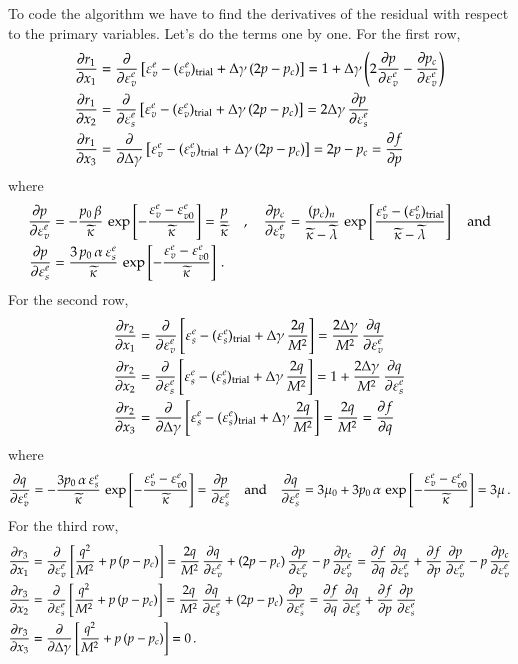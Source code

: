 \documentclass[twoside,10pt,a4paper]{article}
\begin{document}
To code the algorithm we have to find the derivatives of the residual with respect to the primary variables.
Let's do the terms one by one.  For the first row,
\[
  \Bal
  \Partial{r_1}{x_1} & = \Partial{}{\Ve_v^e}\left[\Ve_v^e -  (\Ve_v^e)_\Trial + \Delta\gamma\,(2p-p_c)\right] 
     = 1 + \Delta\gamma\left(2\Partial{p}{\Ve_v^e} - \Partial{p_c}{\Ve_v^e}\right) \\
  \Partial{r_1}{x_2} & = \Partial{}{\Ve_s^e}\left[\Ve_v^e -  (\Ve_v^e)_\Trial + \Delta\gamma\,(2p-p_c)\right] 
     = 2\Delta\gamma\,\Partial{p}{\Ve_s^e}\\
  \Partial{r_1}{x_3} & = \Partial{}{\Delta\gamma}\left[\Ve_v^e -  (\Ve_v^e)_\Trial + \Delta\gamma\,(2p-p_c)\right]
     = 2p - p_c = \Partial{f}{p}
  \Eal
\]
where
\[
  \Bal
   \Partial{p}{\Ve_v^e} & = -\frac{p_0\,\beta}{\kappatilde}\,\exp\left[-\frac{\Ve_v^e - \Ve_{v0}^e}{\kappatilde}\right] = \frac{p}{\kappatilde} \quad, \quad
   \Partial{p_c}{\Ve_v^e} = \frac{(p_c)_n}{\kappatilde-\lambdatilde}\,\exp\left[\frac{\Ve_v^e - (\Ve_{v}^e)_\Trial}{\kappatilde-\lambdatilde}\right] \quad \Tand \\
   \Partial{p}{\Ve_s^e} & = \frac{3\,p_0\,\alpha\,\Ve_s^e}{\kappatilde}\,\exp\left[-\frac{\Ve_v^e - \Ve_{v0}^e}{\kappatilde}\right] \,.
  \Eal
\]
For the second row,
\[
  \Bal
  \Partial{r_2}{x_1} & = \Partial{}{\Ve_v^e}\left[\Ve_s^e -  (\Ve_s^e)_\Trial + \Delta\gamma\,\frac{2q}{M^2}\right] 
     = \frac{2\Delta\gamma}{M^2}\,\Partial{q}{\Ve_v^e} \\
  \Partial{r_2}{x_2} & = \Partial{}{\Ve_s^e}\left[\Ve_s^e -  (\Ve_s^e)_\Trial + \Delta\gamma\,\frac{2q}{M^2}\right] 
     = 1 + \frac{2\Delta\gamma}{M^2}\,\Partial{q}{\Ve_s^e}\\
  \Partial{r_2}{x_3} & = \Partial{}{\Delta\gamma}\left[\Ve_s^e -  (\Ve_s^e)_\Trial + \Delta\gamma\,\frac{2q}{M^2}\right]
     = \frac{2q}{M^2} = \Partial{f}{q}
  \Eal
\]
where
\[
  \Partial{q}{\Ve_v^e} = -\frac{3p_0\,\alpha\,\Ve_s^e}{\kappatilde}\,\exp\left[-\frac{\Ve_v^e - \Ve_{v0}^e}{\kappatilde}\right] = \Partial{p}{\Ve_s^e}
  \quad \Tand \quad 
  \Partial{q}{\Ve_s^e} = 3\mu_0 + 3p_0\,\alpha\,\exp\left[-\frac{\Ve_v^e - \Ve_{v0}^e}{\kappatilde}\right] = 3\mu \,.
\]
For the third row, 
\[
  \Bal
  \Partial{r_3}{x_1} & = \Partial{}{\Ve_v^e}\left[\frac{q^2}{M^2} + p\,(p - p_c)\right]
     = \frac{2q}{M^2}\,\Partial{q}{\Ve_v^e} + (2p - p_c)\,\Partial{p}{\Ve_v^e} - p\,\Partial{p_c}{\Ve_v^e} 
     = \Partial{f}{q}\,\Partial{q}{\Ve_v^e} + \Partial{f}{p}\,\Partial{p}{\Ve_v^e} - p\,\Partial{p_c}{\Ve_v^e} \\
  \Partial{r_3}{x_2} & = \Partial{}{\Ve_s^e}\left[\frac{q^2}{M^2} + p\,(p - p_c)\right]
     = \frac{2q}{M^2}\,\Partial{q}{\Ve_s^e} + (2p - p_c)\,\Partial{p}{\Ve_s^e} 
     = \Partial{f}{q}\,\Partial{q}{\Ve_s^e} + \Partial{f}{p}\,\Partial{p}{\Ve_s^e} \\
  \Partial{r_3}{x_3} & = \Partial{}{\Delta\gamma}\left[\frac{q^2}{M^2} + p\,(p - p_c)\right]
     =  0 \,.
  \Eal
\]
\end{document}
